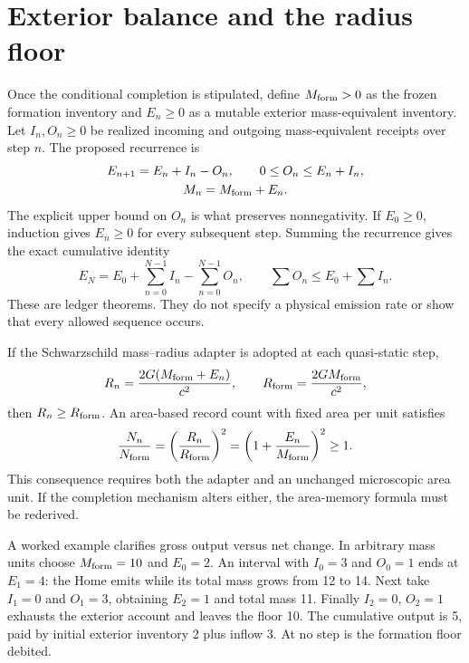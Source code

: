 \section{Exterior balance and the radius floor}
Once the conditional completion is stipulated, define $M_{\rm form}>0$ as the frozen formation inventory and $E_n\geq0$ as a mutable exterior mass-equivalent inventory. Let $I_n,O_n\geq0$ be realized incoming and outgoing mass-equivalent receipts over step $n$. The proposed recurrence is
\begin{equation}
 \begin{gathered}
 E_{n+1}=E_n+I_n-O_n,\qquad 0\leq O_n\leq E_n+I_n,\\
 M_n=M_{\rm form}+E_n.
 \end{gathered}
 \label{c12:recurrence}
\end{equation}
The explicit upper bound on $O_n$ is what preserves nonnegativity. If $E_0\geq0$, induction gives $E_n\geq0$ for every subsequent step. Summing the recurrence gives the exact cumulative identity
\begin{equation}
 E_N=E_0+\sum_{n=0}^{N-1}I_n-\sum_{n=0}^{N-1}O_n,
 \qquad
 \sum O_n\leq E_0+\sum I_n.
 \label{c12:cumulative}
\end{equation}
These are ledger theorems. They do not specify a physical emission rate or show that every allowed sequence occurs.

If the Schwarzschild mass--radius adapter is adopted at each quasi-static step,
\begin{equation}
 R_n=\frac{2G(M_{\rm form}+E_n)}{c^2},\qquad
 R_{\rm form}=\frac{2GM_{\rm form}}{c^2},
 \label{c12:radius}
\end{equation}
then $R_n\geq R_{\rm form}$. An area-based record count with fixed area per unit satisfies
\begin{equation}
 \frac{N_n}{N_{\rm form}}=
 \left(\frac{R_n}{R_{\rm form}}\right)^2
 =\left(1+\frac{E_n}{M_{\rm form}}\right)^2\geq1.
 \label{c12:areamemory}
\end{equation}
This consequence requires both the adapter and an unchanged microscopic area unit. If the completion mechanism alters either, the area-memory formula must be rederived.

A worked example clarifies gross output versus net change. In arbitrary mass units choose $M_{\rm form}=10$ and $E_0=2$. An interval with $I_0=3$ and $O_0=1$ ends at $E_1=4$: the Home emits while its total mass grows from 12 to 14. Next take $I_1=0$ and $O_1=3$, obtaining $E_2=1$ and total mass 11. Finally $I_2=0$, $O_2=1$ exhausts the exterior account and leaves the floor 10. The cumulative output is 5, paid by initial exterior inventory 2 plus inflow 3. At no step is the formation floor debited.

